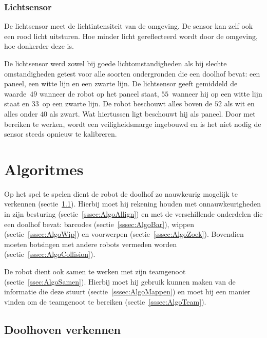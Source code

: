 \documentclass[eind]{penoverslag}
\begin{document}

\subsubsection{Lichtsensor}
De lichtsensor meet de lichtintensiteit van de omgeving. De sensor kan zelf ook een rood licht uitsturen. Hoe minder licht gereflecteerd wordt door de omgeving, hoe donkerder deze is.

De lichtsensor werd zowel bij goede lichtomstandigheden als bij slechte omstandigheden getest voor alle soorten ondergronden die een doolhof bevat: een paneel, een witte lijn en een zwarte lijn.
De lichtsensor geeft gemiddeld de waarde~$49$ wanneer de robot op het paneel staat, $55$~wanneer hij op een witte lijn staat en $33$~op een zwarte lijn. De robot beschouwt alles boven de $52$ als wit en alles onder $40$ als zwart. Wat hiertussen ligt beschouwt hij als paneel. Door met bereiken te werken, wordt een veiligheidsmarge ingebouwd en is het niet nodig de sensor steeds opnieuw te kalibreren.



\section{Algoritmes}
\label{sec:Algo}

Op het spel te spelen dient de robot de doolhof zo nauwkeurig mogelijk te verkennen (sectie~\ref{ssec:AlgoVerken}). Hierbij moet hij rekening houden met onnauwkeurigheden in zijn besturing (sectie~\ref{sssec:AlgoAllign}) en met de verschillende onderdelen die een doolhof bevat: barcodes (sectie~\ref{sssec:AlgoBar}), wippen (sectie~\ref{sssec:AlgoWip}) en voorwerpen (sectie~\ref{sssec:AlgoZoek}). Bovendien moeten botsingen met andere robots vermeden worden (sectie~\ref{sssec:AlgoCollision}).

De robot dient ook samen te werken met zijn teamgenoot (sectie~\ref{ssec:AlgoSamen}). Hierbij moet hij gebruik kunnen maken van de informatie die deze stuurt (sectie~\ref{sssec:AlgoMappen}) en moet hij een manier vinden om de teamgenoot te bereiken (sectie~\ref{sssec:AlgoTeam}).


\subsection{Doolhoven verkennen}
\label{ssec:AlgoVerken}
\end{document}
